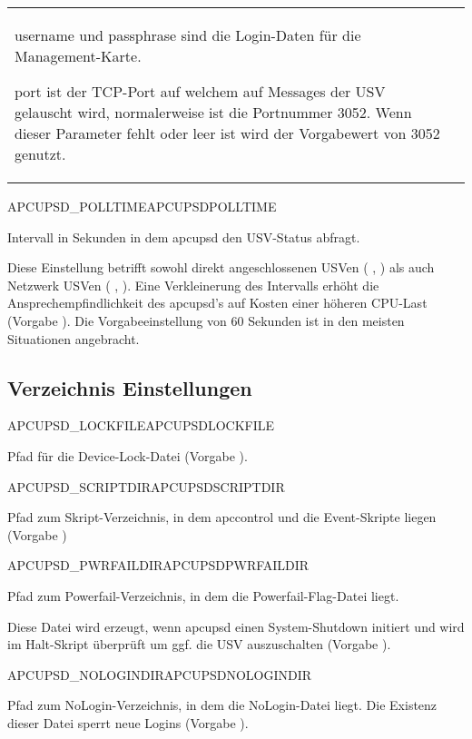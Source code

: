 \begin{description}
\begin{tabular}{p{20mm}p{120mm}}
  username und passphrase sind die Login-Daten für die Management-Karte. 
  
  port ist der TCP-Port auf welchem auf Messages der USV gelauscht wird, 
  normalerweise ist die Portnummer 3052. Wenn dieser Parameter fehlt oder leer
  ist wird der Vorgabewert von 3052 genutzt.
  \\
\end{tabular}

 {APCUPSD\_POLLTIME}{APCUPSDPOLLTIME}

  Intervall in Sekunden in dem apcupsd den USV-Status abfragt.
  
  Diese Einstellung betrifft sowohl direkt angeschlossenen USVen
  ( , ) 
  als auch Netzwerk USVen ( 
  , ).
  Eine Verkleinerung des Intervalls erhöht die Ansprechempfindlichkeit des apcupsd's
  auf Kosten einer höheren CPU-Last (Vorgabe ).
  Die Vorgabeeinstellung von 60 Sekunden ist in den meisten Situationen angebracht.

\end {description}

\subsection{Verzeichnis Einstellungen}
\begin {description}

 {APCUPSD\_LOCKFILE}{APCUPSDLOCKFILE}
  
  Pfad für die Device-Lock-Datei (Vorgabe ).
  

 {APCUPSD\_SCRIPTDIR}{APCUPSDSCRIPTDIR}
    
  Pfad zum Skript-Verzeichnis, in dem apccontrol und die Event-Skripte liegen
  (Vorgabe )


 {APCUPSD\_PWRFAILDIR}{APCUPSDPWRFAILDIR}

  Pfad zum Powerfail-Verzeichnis, in dem die Powerfail-Flag-Datei liegt. 
  
  Diese Datei wird erzeugt, wenn apcupsd einen System-Shutdown initiert und
  wird im Halt-Skript überprüft um ggf. die USV auszuschalten
  (Vorgabe ).


 {APCUPSD\_NOLOGINDIR}{APCUPSDNOLOGINDIR}

  Pfad zum NoLogin-Verzeichnis, in dem die NoLogin-Datei liegt.
  Die Existenz dieser Datei sperrt neue Logins 
  (Vorgabe ).

\end {description}

